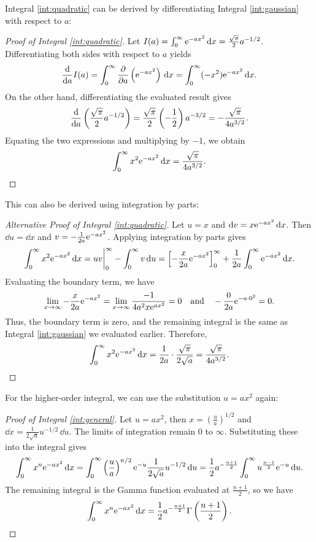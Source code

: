 Integral \ref{int:quadratic} can be derived by differentiating Integral \ref{int:gaussian} with respect to $a$:
\begin{proof}[Proof of Integral \ref{int:quadratic}]
  Let $I(a) = \int_0^\infty \mathrm{e}^{-ax^2}\,\mathrm{d} x = \frac{\sqrt{\mathrm{\pi}}}{2} a^{-1/2}$. Differentiating both sides with respect to $a$ yields
  \[
    \frac{\mathrm{d}}{\mathrm{d} a} I(a) = \int_0^\infty \frac{\partial}{\partial a} \left( \mathrm{e}^{-ax^2} \right)\,\mathrm{d} x = \int_0^\infty (-x^2) \mathrm{e}^{-ax^2}\,\mathrm{d} x.
  \]
  On the other hand, differentiating the evaluated result gives
  \[
    \frac{\mathrm{d}}{\mathrm{d} a} \left( \frac{\sqrt{\mathrm{\pi}}}{2} a^{-1/2} \right) = \frac{\sqrt{\mathrm{\pi}}}{2} \left( -\frac{1}{2} \right) a^{-3/2} = -\frac{\sqrt{\mathrm{\pi}}}{4a^{3/2}}.
  \]
  Equating the two expressions and multiplying by $-1$, we obtain
  \[
    \int_0^\infty x^2 \mathrm{e}^{-ax^2}\,\mathrm{d} x = \frac{\sqrt{\mathrm{\pi}}}{4a^{3/2}}. \qedhere
  \]
\end{proof}
This can also be derived using integration by parts:
\begin{proof}[Alternative Proof of Integral \ref{int:quadratic}]
  Let $u = x$ and $\mathrm{d} v = x \mathrm{e}^{-ax^2}\,\mathrm{d} x$. Then $\dd u = \dd x$ and $v = -\frac{1}{2a} \mathrm{e}^{-ax^2}$. Applying integration by parts gives
  \[
    \int_0^\infty x^2 \mathrm{e}^{-ax^2}\,\mathrm{d} x = uv \bigg|_0^\infty - \int_0^\infty v\,\mathrm{d} u = \left[ -\frac{x}{2a} \mathrm{e}^{-ax^2} \right]_0^\infty + \frac{1}{2a} \int_0^\infty \mathrm{e}^{-ax^2}\,\mathrm{d} x.
  \]
  Evaluating the boundary term, we have
  \[
    \lim_{x \to \infty} -\frac{x}{2a} \mathrm{e}^{-ax^2} = \lim_{x \to \infty} \frac{-1}{4a^2 x \mathrm{e}^{ax^2}} = 0 \quad \text{and} \quad -\frac{0}{2a} \mathrm{e}^{-a \cdot 0^2} = 0.
  \]
  Thus, the boundary term is zero, and the remaining integral is the same as Integral \ref{int:gaussian} we evaluated earlier. Therefore,
  \[
    \int_0^\infty x^2 \mathrm{e}^{-ax^2}\,\mathrm{d} x = \frac{1}{2a} \cdot \frac{\sqrt{\mathrm{\pi}}}{2\sqrt{a}} = \frac{\sqrt{\mathrm{\pi}}}{4a^{3/2}}. \qedhere
  \]
\end{proof}

For the higher-order integral, we can use the substitution $u = ax^2$ again:
\begin{proof}[Proof of Integral \ref{int:general}]
  Let $u = ax^2$, then $x = \left(\frac{u}{a}\right)^{1/2}$ and $\dd x = \frac{1}{2\sqrt{a}} u^{-1/2}\,\dd u$. The limits of integration remain $0$ to $\infty$. Substituting these into the integral gives
  \[
    \int_0^\infty x^n \mathrm{e}^{-ax^2}\,\mathrm{d} x = \int_0^\infty \left(\frac{u}{a}\right)^{n/2} \mathrm{e}^{-u} \frac{1}{2\sqrt{a}} u^{-1/2}\,\mathrm{d} u = \frac{1}{2} a^{-\frac{n+1}{2}} \int_0^\infty u^{\frac{n-1}{2}} \mathrm{e}^{-u}\,\mathrm{d} u.
  \]
  The remaining integral is the Gamma function evaluated at $\frac{n+1}{2}$, so we have
  \[
    \int_0^\infty x^n \mathrm{e}^{-ax^2}\,\mathrm{d} x = \frac{1}{2} a^{-\frac{n+1}{2}} \Gamma\left( \frac{n+1}{2} \right). \qedhere
  \]
\end{proof}


